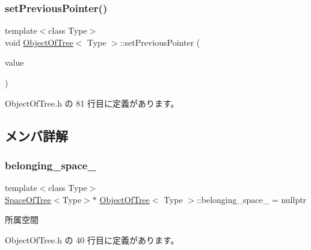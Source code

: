 \subsubsection{\texorpdfstring{set\+Previous\+Pointer()}{setPreviousPointer()}}
{\footnotesize\ttfamily template$<$class Type$>$ \\
void \mbox{\hyperlink{class_object_of_tree}{Object\+Of\+Tree}}$<$ Type $>$\+::set\+Previous\+Pointer (\begin{DoxyParamCaption}\item[{\mbox{\hyperlink{class_object_of_tree}{Object\+Of\+Tree}}$<$ Type $>$ $\ast$}]{value }\end{DoxyParamCaption})\hspace{0.3cm}{\ttfamily [inline]}}



 Object\+Of\+Tree.\+h の 81 行目に定義があります。



\subsection{メンバ詳解}
\mbox{\label{class_object_of_tree_a4f0673854adc10539b4b99558ea3b696}} 
\subsubsection{\texorpdfstring{belonging\+\_\+space\+\_\+}{belonging\_space\_}}
{\footnotesize\ttfamily template$<$class Type$>$ \\
\mbox{\hyperlink{class_space_of_tree}{Space\+Of\+Tree}}$<$Type$>$$\ast$ \mbox{\hyperlink{class_object_of_tree}{Object\+Of\+Tree}}$<$ Type $>$\+::belonging\+\_\+space\+\_\+ = nullptr\hspace{0.3cm}{\ttfamily [private]}}



所属空間 



 Object\+Of\+Tree.\+h の 40 行目に定義があります。

\mbox{\label{class_object_of_tree_a3b8a98c6ba800927492a67ee6dd1d6de}} 
